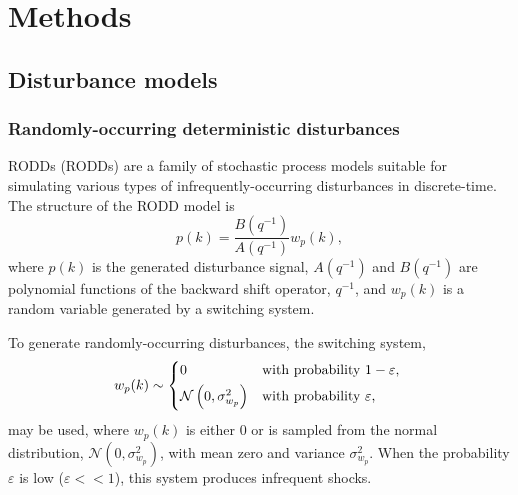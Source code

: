 \chapter{Methods} \label{chap-methods}

\section{Disturbance models} \label{sec:disturbance-models}

\subsection{Randomly-occurring deterministic disturbances} \label{sec:RODD}

\Acrlong{RODD}s (\acrshort{RODD}s) \citep{macgregor_duality_1984} are a family of stochastic process models suitable for simulating various types of infrequently-occurring disturbances in discrete-time.  The structure of the \gls{RODD} model is
\begin{equation} \label{eq:RODD}
	p(k) = \frac{B(q^{-1})}{A(q^{-1})} w_p(k),
\end{equation}
where $p(k)$ is the generated disturbance signal, $A(q^{-1})$ and $B(q^{-1})$ are polynomial functions of the backward shift operator, $q^{-1}$, and $w_p(k)$ is a random variable generated by a switching system.
%
%
%
%
%

To generate randomly-occurring disturbances, the switching system,
\begin{equation} \label{eq:wpk1} 
	w_p(k) \sim 
	\begin{cases*}
		0 & with probability $1-\varepsilon$, \\
		\mathcal{N}\left( 0, \sigma_{w_p}^2 \right) & with probability $\varepsilon$,
	\end{cases*}
\end{equation}
%
may be used, where $w_p(k)$ is either 0 or is sampled from the normal distribution, $\mathcal{N}(0,\sigma_{w_p}^2)$, with mean zero and variance $\sigma_{w_p}^2$.  When the probability $\varepsilon$ is low ($\varepsilon<<1$), this system produces infrequent shocks.
%

